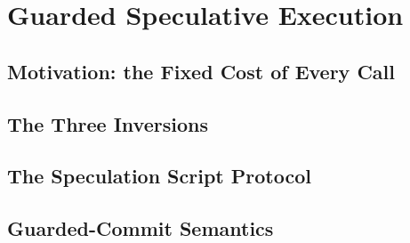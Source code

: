 \chapter{Guarded Speculative Execution}
\label{ch:speculation}

\section{Motivation: the Fixed Cost of Every Call}
\label{sec:spec-motivation}

\section{The Three Inversions}
\label{sec:spec-inversions}

\section{The Speculation Script Protocol}
\label{sec:spec-protocol}

\section{Guarded-Commit Semantics}
\label{sec:spec-semantics}


